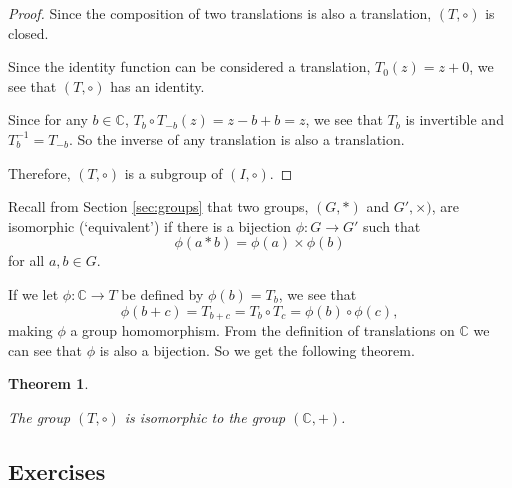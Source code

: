 \documentclass[
]{book}
\newtheorem{theorem}{Theorem}[chapter]
\theoremstyle{definition}
\theoremstyle{definition}
\theoremstyle{definition}
\theoremstyle{definition}
\theoremstyle{remark}
\begin{document}
\begin{proof}

Since the composition of two translations is also a translation, \((T,\circ)\) is closed.

Since the identity function can be considered a translation, \(T_0(z)=z+0\), we see that \((T,\circ)\) has an identity.

Since for any \(b\in \mathbb{C}\), \(T_b \circ T_{-b} (z) = z-b+b=z\), we see that \(T_b\) is invertible and \(T_b^{-1} = T_{-b}\). So the inverse of any translation is also a translation.

Therefore, \((T,\circ)\) is a subgroup of \((I,\circ )\).

\end{proof}

Recall from Section \ref{sec:groups} that two groups, \((G,*)\) and \(G',\times)\), are isomorphic (`equivalent') if there is a bijection \(\phi: G \rightarrow G'\) such that
\[\phi(a*b) = \phi(a)\times \phi(b)\]
for all \(a,b\in G\).

If we let \(\phi:\mathbb{C} \rightarrow T\) be defined by \(\phi(b)=T_b\), we see that \[\phi(b+c) = T_{b+c} = T_b \circ T_c = \phi(b) \circ \phi(c),\] making \(\phi\) a group homomorphism. From the definition of translations on \(\mathbb{C}\) we can see that \(\phi\) is also a bijection. So we get the following theorem.

\begin{theorem}
\protect\hypertarget{thm:unlabeled-div-265}{}\label{thm:unlabeled-div-265}

The group \((T,\circ)\) is isomorphic to the group \((\mathbb{C},+)\).

\end{theorem}

\hypertarget{exercises-52}{%
\subsection{Exercises}\label{exercises-52}}
\end{document}
